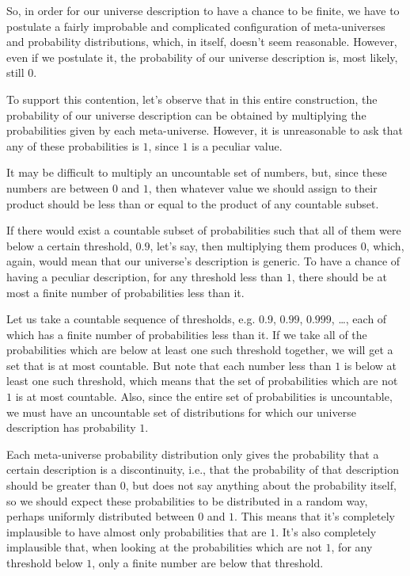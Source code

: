 \documentclass[a4paper
,draft
]{article}
\begin{document}
So, in order for our universe description to have a chance to be finite,
we have to postulate a fairly improbable and complicated configuration
of meta-universes and probability distributions, which,
in itself, doesn't seem reasonable.
However, even if we postulate it, the probability of our universe description
is, most likely, still $0$.

To support this contention, let's observe that in this entire construction,
the probability of our universe description can be obtained by multiplying the
probabilities given by each meta-universe. However, it is unreasonable
to ask that any of these probabilities is $1$, since $1$ is a peculiar value.

It may be difficult to multiply an uncountable set of numbers, but,
since these numbers are between $0$ and $1$, then whatever value we should
assign to their product
should be less than or equal to the product of any countable subset.

If there would exist a countable subset of probabilities such that all of them were below a certain threshold,
$0.9$, let's say, then multiplying them produces $0$, which, again, would mean
that our universe's description is generic. To have a chance of having
a peculiar description, for any threshold less than $1$, there should be at
most a finite number of probabilities less than it.

Let us take a countable sequence of thresholds, e.g.
$0.9$, $0.99$, $0.999$, \dots, each of which has a finite number of
probabilities less than it.
If we take all of the probabilities which are below at least
one such threshold together, we will get a set that is at most countable.
But note that each number less than $1$ is below at least one such threshold,
which means that the set of
probabilities which are not $1$ is at most countable.
Also, since the entire set of
probabilities is uncountable, we must have an uncountable set of distributions
for which our universe description has probability $1$.

Each meta-universe probability distribution only gives the
probability that a certain description is a discontinuity, i.e., that
the probability of that description should be greater than $0$, but does not say
anything about the probability itself,
so we should expect these probabilities to
be distributed in a random way, perhaps uniformly distributed between $0$ and
$1$.
This means that it's completely implausible to have almost only
probabilities that are $1$.
It's also completely implausible that, when looking at the
probabilities which are not $1$, for any threshold below $1$, only a finite
number are below that threshold.
\end{document}
